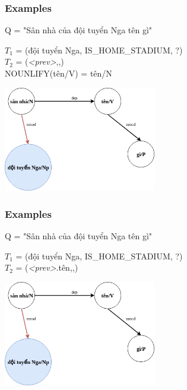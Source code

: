 \documentclass{beamer}
\begin{document}
\begin{frame}
	\frametitle{Examples}
	
	Q = "Sân nhà của đội tuyển Nga tên gì"
	
	$T_1$ = (đội tuyển Nga, IS\_HOME\_STADIUM, ?)\\
	$T_2$ = (\textit{<prev>},,)\\
	NOUNLIFY(tên/V) = tên/N
	
	\begin{center} 
		\centering 
			\includegraphics[width=0.5\textwidth,height=0.5\textheight,keepaspectratio]{secondextree2}
			\vspace{0.5cm} 
	\end{center}
		
\end{frame}

\begin{frame}
	\frametitle{Examples}
	
	Q = "Sân nhà của đội tuyển Nga tên gì"
	
	$T_1$ = (đội tuyển Nga, IS\_HOME\_STADIUM, ?)\\
	$T_2$ = (\textit{<prev>}.tên,,)
	
	\begin{center} 
		\centering 
			\includegraphics[width=0.5\textwidth,height=0.5\textheight,keepaspectratio]{secondextree2}
			\vspace{0.5cm} 
	\end{center}
		
\end{frame}
\end{document}
